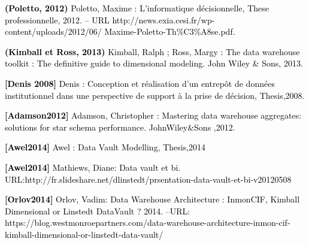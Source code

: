 \documentclass[a4paper,12pt]{report}
\begin{document}
	\item[] \textcolor{black}{
\textbf{(Poletto, 2012)} Poletto, Maxime : L’informatique décisionnelle, These professionnelle, 2012. – URL http://news.exia.cesi.fr/wp-content/uploads/2012/06/
Maxime-Poletto-Th\%C3\%A8se.pdf.}
\\

	\item[] \textcolor{black}{
\textbf{(Kimball et Ross, 2013)} Kimball, Ralph ; Ross, Margy : The data warehouse toolkit : The definitive guide to dimensional modeling. John Wiley \& Sons, 2013.	
}
\\

	\item[] \textcolor{black}{
\textbf{[Denis 2008]} Denis : Conception et réalisation d’un entrepôt de données institutionnel dans une perspective de support à la prise de décision, Thesis,2008.}
\\

	\item[] \textcolor{black}{
\textbf{[Adamson2012] } Adamson, Christopher : Mastering data warehouse aggregates: solutions for star schema performance. JohnWiley&Sons ,2012.}
\\

	\item[] \textcolor{black}{
\textbf{[Awel2014]}  Awel : Data Vault Modelling, Thesis,2014}
\\

	\item[] \textcolor{black}{
\textbf{[Awel2014]} Mathiews, Diane: Data vault et bi. URL:http://fr.slideshare.net/dlinstedt/prsentation-data-vault-et-bi-v20120508}
\\

	\item[] \textcolor{black}{
\textbf{[Orlov2014] } Orlov, Vadim: Data Warehouse Architecture : InmonCIF, Kimball Dimensional or Linstedt DataVault ? 2014. –URL: https://blog.westmonroepartners.com/data-warehouse-architecture-inmon-cif-kimball-dimensional-or-linstedt-data-vault/}
\\
\end{document}
